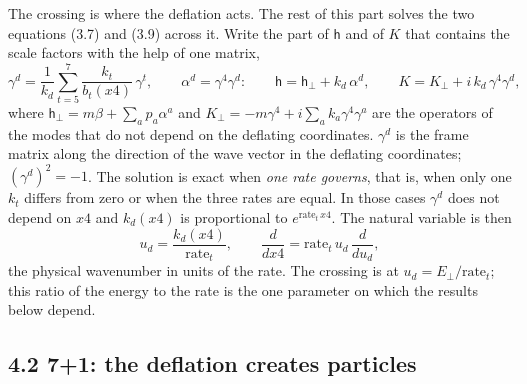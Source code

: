 \documentclass[
  10pt,
]{article}
\begin{document}
The crossing is where the deflation acts. The rest of this part solves
the two equations (3.7) and (3.9) across it. Write the part of
\(\mathsf h\) and of \(K\) that contains the scale factors with the help
of one matrix,
\[\gamma^d=\frac1{k_d}\sum_{t=5}^7\frac{k_t}{b_t(x4)}\,\gamma^t,\qquad\alpha^d=\gamma^4\gamma^d:\qquad
\mathsf h=\mathsf h_\perp+k_d\,\alpha^d,\qquad K=K_\perp+i\,k_d\,\gamma^4\gamma^d,\tag{4.1}\]
where \(\mathsf h_\perp=m\beta+\sum_ap_a\alpha^a\) and
\(K_\perp=-m\gamma^4+i\sum_ak_a\gamma^4\gamma^a\) are the operators of
the modes that do not depend on the deflating coordinates. \(\gamma^d\)
is the frame matrix along the direction of the wave vector in the
deflating coordinates; \((\gamma^d)^2=-1\). The solution is exact when
\emph{one rate governs}, that is, when only one \(k_t\) differs from
zero or when the three rates are equal. In those cases \(\gamma^d\) does
not depend on \(x4\) and \(k_d(x4)\) is proportional to
\(e^{\mathrm{rate}_t\,x4}\). The natural variable is then
\[u_d=\frac{k_d(x4)}{\mathrm{rate}_t},\qquad\frac{d}{dx4}=\mathrm{rate}_t\,u_d\,\frac{d}{du_d},\tag{4.1a}\]
the physical wavenumber in units of the rate. The crossing is at
\(u_d=E_\perp/\mathrm{rate}_t\); this ratio of the energy to the rate is
the one parameter on which the results below depend.

\hypertarget{the-deflation-creates-particles}{%
\subsection{4.2 7+1: the deflation creates
particles}\label{the-deflation-creates-particles}}
\end{document}
